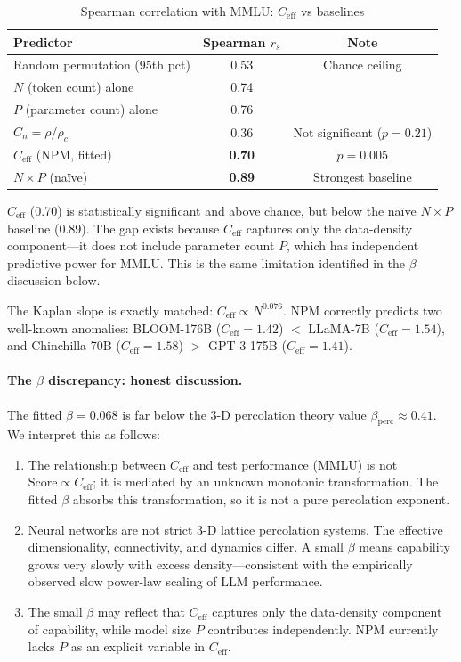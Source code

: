 \documentclass[11pt,a4paper]{article}
\newcommand{\Ceff}{C_{\text{eff}}}
\begin{document}
\begin{table}[H]
\centering
\caption{Spearman correlation with MMLU: $\Ceff$ vs baselines}
\label{tab:spearman-baselines}
\small
\begin{tabular}{lcc}
\toprule
\textbf{Predictor} & \textbf{Spearman $r_s$} & \textbf{Note} \\
\midrule
Random permutation (95th pct) & 0.53 & Chance ceiling \\
$N$ (token count) alone & 0.74 & \\
$P$ (parameter count) alone & 0.76 & \\
$C_n = \rho/\rho_c$ & 0.36 & Not significant ($p=0.21$) \\
$\Ceff$ (NPM, fitted) & \textbf{0.70} & $p=0.005$ \\
$N \times P$ (na\"ive) & \textbf{0.89} & Strongest baseline \\
\bottomrule
\end{tabular}
\end{table}

$\Ceff$ (0.70) is statistically significant and above chance, but below
the na\"ive $N{\times}P$ baseline (0.89). The gap exists because $\Ceff$
captures only the data-density component---it does not include parameter
count $P$, which has independent predictive power for MMLU. This is the
same limitation identified in the $\beta$ discussion below.

The Kaplan slope is exactly matched: $\Ceff \propto N^{0.076}$.
NPM correctly predicts two well-known anomalies:
BLOOM-176B ($\Ceff=1.42$) $<$ LLaMA-7B ($\Ceff=1.54$), and
Chinchilla-70B ($\Ceff=1.58$) $>$ GPT-3-175B ($\Ceff=1.41$).

\paragraph{The $\beta$ discrepancy: honest discussion.}
The fitted $\beta=0.068$ is far below the 3-D percolation theory value
$\beta_{\text{perc}}\approx 0.41$. We interpret this as follows:
\begin{enumerate}[nosep]
\item The relationship between $\Ceff$ and test performance (MMLU) is not
$\text{Score}\propto\Ceff$; it is mediated by an unknown monotonic
transformation. The fitted $\beta$ absorbs this transformation, so it is
not a pure percolation exponent.
\item Neural networks are not strict 3-D lattice percolation systems.
The effective dimensionality, connectivity, and dynamics differ. A small
$\beta$ means capability grows very slowly with excess density---consistent
with the empirically observed slow power-law scaling of LLM performance.
\item The small $\beta$ may reflect that $\Ceff$ captures only the
data-density component of capability, while model size $P$ contributes
independently. NPM currently lacks $P$ as an explicit variable in $\Ceff$.
\end{enumerate}
\end{document}
